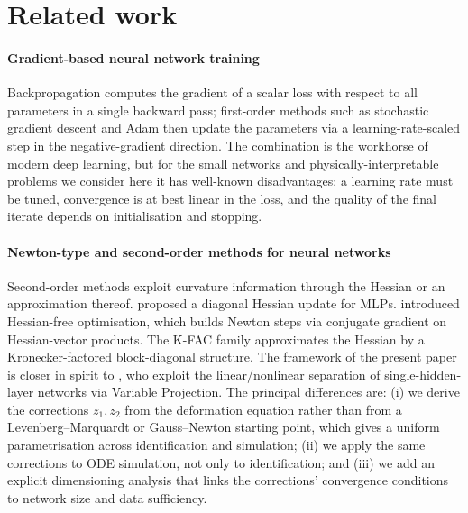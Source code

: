 \documentclass[preprint,12pt,numbers]{elsarticle}
\begin{document}
\section{Related work}
\label{sec:related}

\paragraph{Gradient-based neural network training} Backpropagation
\cite{RumelhartHintonWilliams1986} computes the gradient of a scalar
loss with respect to all parameters in a single backward pass; first-order
methods such as stochastic gradient descent and Adam \cite{Adam2015}
then update the parameters via a learning-rate-scaled step in the
negative-gradient direction. The combination is the workhorse of modern
deep learning, but for the small networks and physically-interpretable
problems we consider here it has well-known disadvantages: a learning
rate must be tuned, convergence is at best linear in the loss, and the
quality of the final iterate depends on initialisation and stopping.

\paragraph{Newton-type and second-order methods for neural networks}
Second-order methods exploit curvature information through the Hessian
or an approximation thereof. \citet{BeckerLeCun1988} proposed a diagonal
Hessian update for MLPs. \citet{Martens2010} introduced Hessian-free
optimisation, which builds Newton steps via conjugate gradient on
Hessian-vector products. The K-FAC family \cite{MartensGrosse2015}
approximates the Hessian by a Kronecker-factored block-diagonal
structure. The framework of the present paper is closer in spirit to
\citet{Sjolund2014}, who exploit the linear/nonlinear separation of
single-hidden-layer networks via Variable Projection. The principal
differences are: (i) we derive the corrections $z_1, z_2$ from the
deformation equation rather than from a Levenberg--Marquardt or
Gauss--Newton starting point, which gives a uniform parametrisation
across identification and simulation; (ii) we apply the same
corrections to ODE simulation, not only to identification; and (iii)
we add an explicit dimensioning analysis that links the corrections'
convergence conditions to network size and data sufficiency.
\end{document}
